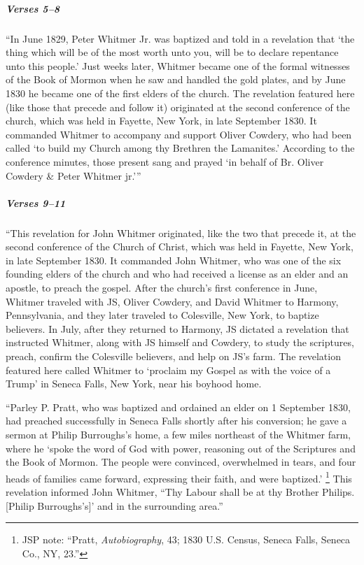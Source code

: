 			\subparagraph{Verses 5--8}
			
				``In June 1829, Peter Whitmer Jr. was baptized and told in a revelation that `the thing which will be of the most worth unto you, will be to declare repentance unto this people.' Just weeks later, Whitmer became one of the formal witnesses of the Book of Mormon when he saw and handled the gold plates, and by June 1830 he became one of the first elders of the church. The revelation featured here (like those that precede and follow it) originated at the second conference of the church, which was held in Fayette, New York, in late September 1830. It commanded Whitmer to accompany and support Oliver Cowdery, who had been called `to build my Church among thy Brethren the Lamanites.' According to the conference minutes, those present sang and prayed `in behalf of Br. Oliver Cowdery \& Peter Whitmer jr.'''
			
			\subparagraph{Verses 9--11}
			
				``This revelation for John Whitmer originated, like the two that precede it, at the second conference of the Church of Christ, which was held in Fayette, New York, in late September 1830. It commanded John Whitmer, who was one of the six founding elders of the church and who had received a license as an elder and an apostle, to preach the gospel. After the church's first conference in June, Whitmer traveled with JS, Oliver Cowdery, and David Whitmer to Harmony, Pennsylvania, and they later traveled to Colesville, New York, to baptize believers. In July, after they returned to Harmony, JS dictated a revelation that instructed Whitmer, along with JS himself and Cowdery, to study the scriptures, preach, confirm the Colesville believers, and help on JS's farm. The revelation featured here called Whitmer to `proclaim my Gospel as with the voice of a Trump' in Seneca Falls, New York, near his boyhood home.
				
				``Parley P. Pratt, who was baptized and ordained an elder on 1 September 1830, had preached successfully in Seneca Falls shortly after his conversion; he gave a sermon at Philip Burroughs's home, a few miles northeast of the Whitmer farm, where he `spoke the word of God with power, reasoning out of the Scriptures and the Book of Mormon. The people were convinced, overwhelmed in tears, and four heads of families came forward, expressing their faith, and were baptized.'%
					\footnote{%
						JSP note: ``Pratt, \textit{Autobiography}, 43; 1830 U.S. Census, Seneca Falls, Seneca Co., NY, 23.''
						}
				This revelation informed John Whitmer, ``Thy Labour shall be at thy Brother Philips. [Philip Burroughs's]' and in the surrounding area.''
			

